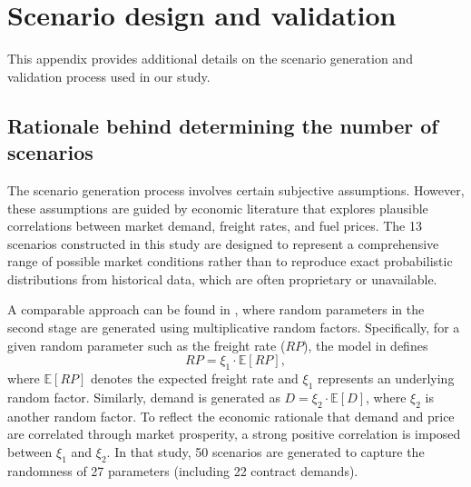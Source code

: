 \documentclass[11pt,english]{article}
\begin{document}
\clearpage




\newpage
\appendix

\section{Scenario design and validation}
\label{appendix:scenarios}

This appendix provides additional details on the scenario generation and validation process used in our study.

\subsection{Rationale behind determining the number of scenarios}

The scenario generation process involves certain subjective assumptions. However, these assumptions are guided by economic literature that explores plausible correlations between market demand, freight rates, and fuel prices. The 13 scenarios constructed in this study are designed to represent a comprehensive range of possible market conditions rather than to reproduce exact probabilistic distributions from historical data, which are often proprietary or unavailable.

A comparable approach can be found in \cite{wang2018planning}, where random parameters in the second stage are generated using multiplicative random factors. Specifically, for a given random parameter such as the freight rate ($RP$), the model in \cite{wang2018planning} defines
$$
RP = \xi_1 \cdot \mathbb{E}[RP],
$$
where $\mathbb{E}[RP]$ denotes the expected freight rate and $\xi_1$ represents an underlying random factor. Similarly, demand is generated as $D = \xi_2 \cdot \mathbb{E}[D]$, where $\xi_2$ is another random factor. To reflect the economic rationale that demand and price are correlated through market prosperity, a strong positive correlation is imposed between $\xi_1$ and $\xi_2$. In that study, 50 scenarios are generated to capture the randomness of 27 parameters (including 22 contract demands).
\end{document}
